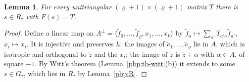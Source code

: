 \documentclass[10pt]{amsart}
\newtheorem{lemma}[theorem]{Lemma}
\theoremstyle{definition}
\theoremstyle{remark}
\begin{document}
\begin{lemma}\label{pbp:frame}
For every unitriangular $(\varrho+1)\times(\varrho+1)$ matrix $T$ there is $s\in R_\tau$ with $F(s)=T$.
\end{lemma}
\begin{proof}
Define a linear map on $A^\perp=\langle\tilde f_0,\dots,\tilde f_\varrho,x_1,\dots,x_k\rangle$ by
$\tilde f_a\mapsto\sum_{a'}T_{a'a}\tilde f_{a'}$, $x_i\mapsto x_i$. It is injective and preserves $h$:
the images of $\tilde e_1,\dots,\tilde e_\varrho$ lie in $A$, which is isotropic and orthogonal to
$\tilde z$ and the $x_i$; the image of $\tilde z$ is $\tilde z+\alpha$ with $\alpha\in A$, of square
$-1$. By Witt's theorem (Lemma~\ref{pbp:tb-witt}(b)) it extends to some $s\in G_\tau$, which lies in $R_\tau$ by
Lemma~\ref{pbp:R}.
\end{proof}
\end{document}
